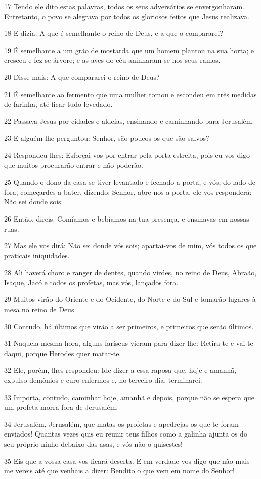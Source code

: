 \par 17 Tendo ele dito estas palavras, todos os seus adversários se envergonharam. Entretanto, o povo se alegrava por todos os gloriosos feitos que Jesus realizava.
\par 18 E dizia: A que é semelhante o reino de Deus, e a que o compararei?
\par 19 É semelhante a um grão de mostarda que um homem plantou na sua horta; e cresceu e fez-se árvore; e as aves do céu aninharam-se nos seus ramos.
\par 20 Disse mais: A que compararei o reino de Deus?
\par 21 É semelhante ao fermento que uma mulher tomou e escondeu em três medidas de farinha, até ficar tudo levedado.
\par 22 Passava Jesus por cidades e aldeias, ensinando e caminhando para Jerusalém.
\par 23 E alguém lhe perguntou: Senhor, são poucos os que são salvos?
\par 24 Respondeu-lhes: Esforçai-vos por entrar pela porta estreita, pois eu vos digo que muitos procurarão entrar e não poderão.
\par 25 Quando o dono da casa se tiver levantado e fechado a porta, e vós, do lado de fora, começardes a bater, dizendo: Senhor, abre-nos a porta, ele vos responderá: Não sei donde sois.
\par 26 Então, direis: Comíamos e bebíamos na tua presença, e ensinavas em nossas ruas.
\par 27 Mas ele vos dirá: Não sei donde vós sois; apartai-vos de mim, vós todos os que praticais iniqüidades.
\par 28 Ali haverá choro e ranger de dentes, quando virdes, no reino de Deus, Abraão, Isaque, Jacó e todos os profetas, mas vós, lançados fora.
\par 29 Muitos virão do Oriente e do Ocidente, do Norte e do Sul e tomarão lugares à mesa no reino de Deus.
\par 30 Contudo, há últimos que virão a ser primeiros, e primeiros que serão últimos.
\par 31 Naquela mesma hora, alguns fariseus vieram para dizer-lhe: Retira-te e vai-te daqui, porque Herodes quer matar-te.
\par 32 Ele, porém, lhes respondeu: Ide dizer a essa raposa que, hoje e amanhã, expulso demônios e curo enfermos e, no terceiro dia, terminarei.
\par 33 Importa, contudo, caminhar hoje, amanhã e depois, porque não se espera que um profeta morra fora de Jerusalém.
\par 34 Jerusalém, Jerusalém, que matas os profetas e apedrejas os que te foram enviados! Quantas vezes quis eu reunir teus filhos como a galinha ajunta os do seu próprio ninho debaixo das asas, e vós não o quisestes!
\par 35 Eis que a vossa casa vos ficará deserta. E em verdade vos digo que não mais me vereis até que venhais a dizer: Bendito o que vem em nome do Senhor!

